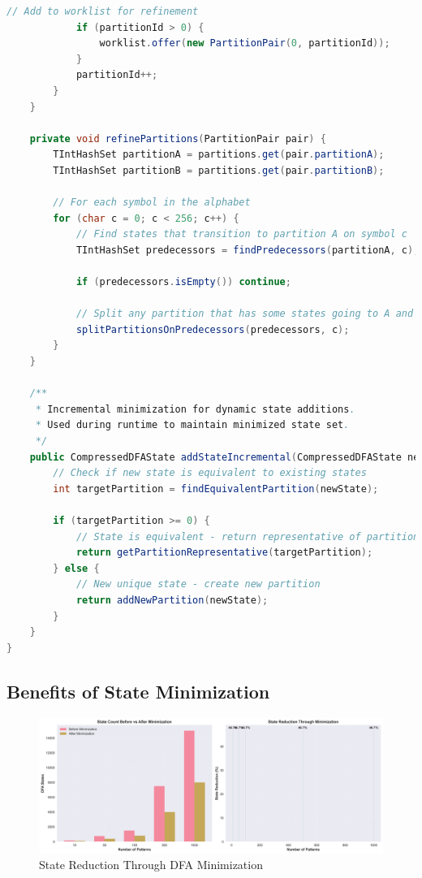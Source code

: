 \documentclass[11pt,a4paper]{article}
\begin{document}
\begin{lstlisting}[language=Java,caption={State Minimization Implementation}]
            // Add to worklist for refinement
            if (partitionId > 0) {
                worklist.offer(new PartitionPair(0, partitionId));
            }
            partitionId++;
        }
    }
    
    private void refinePartitions(PartitionPair pair) {
        TIntHashSet partitionA = partitions.get(pair.partitionA);
        TIntHashSet partitionB = partitions.get(pair.partitionB);
        
        // For each symbol in the alphabet
        for (char c = 0; c < 256; c++) {
            // Find states that transition to partition A on symbol c
            TIntHashSet predecessors = findPredecessors(partitionA, c);
            
            if (predecessors.isEmpty()) continue;
            
            // Split any partition that has some states going to A and some not
            splitPartitionsOnPredecessors(predecessors, c);
        }
    }
    
    /**
     * Incremental minimization for dynamic state additions.
     * Used during runtime to maintain minimized state set.
     */
    public CompressedDFAState addStateIncremental(CompressedDFAState newState) {
        // Check if new state is equivalent to existing states
        int targetPartition = findEquivalentPartition(newState);
        
        if (targetPartition >= 0) {
            // State is equivalent - return representative of partition
            return getPartitionRepresentative(targetPartition);
        } else {
            // New unique state - create new partition
            return addNewPartition(newState);
        }
    }
}
\end{lstlisting}

\subsection{Benefits of State Minimization}

\begin{figure}[H]
\centering
\includegraphics[width=\textwidth]{illustrations/minimization_benefits.png}
\caption{State Reduction Through DFA Minimization}
\label{fig:benefits}
\end{figure}
\end{document}
